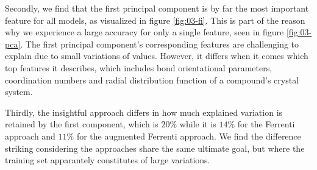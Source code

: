 Secondly, we find that the first principal component is by far the most important feature for all models, as visualized in figure \ref{fig:03-fi}. This is part of the reason why we experience a large accuracy for only a single feature, seen in figure \ref{fig:03-pca}. The first principal component's corresponding features are challenging to explain due to small variations of values. However, it differs when it comes which top features it describes, which includes bond orientational parameters, coordination numbers and radial distribution function of a compound's crystal system.

Thirdly, the insightful approach differs in how much explained variation is retained by the first component, which is $20\%$ while it is $14\%$ for the Ferrenti approach and $11\%$ for the augmented Ferrenti approach. We find the difference striking considering the approaches share the same ultimate goal, but where the training set apparantely constitutes of large variations.
